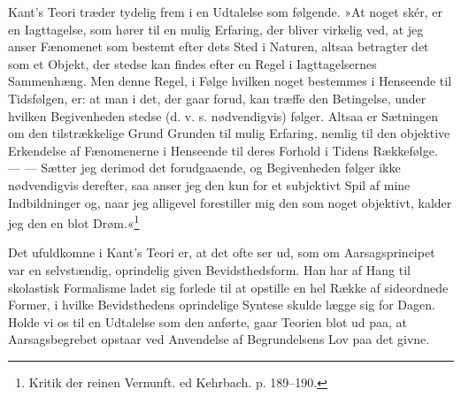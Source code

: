 \documentclass[12pt,a4paper,openany]{book}
\newcommand{\opage}[1]{\marginnote{\footnotesize\textit{[#1]}}}
\begin{document}
Kant’s Teori træder tydelig frem i en Udtalelse som følgende. »At noget
skér, er en Iagttagelse, som hører til en mulig Erfaring, der bliver
virkelig ved, at jeg anser Fænomenet som bestemt efter dets Sted i
Naturen, altsaa betragter det som et Objekt, der stedse kan findes efter
en Regel i Iagttagelsernes Sammenhæng. Men denne Regel, i Følge hvilken
noget bestemmes i Henseende til Tidsfølgen, er: at man i det,
\opage{258}der gaar forud, kan træffe den Betingelse, under hvilken
Begivenheden stedse (d. v. s. nødvendigvis) følger. Altsaa er Sætningen
om den tilstrækkelige Grund Grunden til mulig Erfaring, nemlig til den
objektive Erkendelse af Fænomenerne i Henseende til deres Forhold i
Tidens Rækkefølge. --- --- Sætter jeg derimod det forudgaaende, og
Begivenheden følger ikke nødvendigvis derefter, saa anser jeg den kun
for et subjektivt Spil af mine Indbildninger og, naar jeg alligevel
forestiller mig den som noget objektivt, kalder jeg den en blot
Drøm.«\footnote[1]{Kritik der reinen Vernunft. ed Kehrbach. p. 189--190.}

Det ufuldkomne i Kant’s Teori er, at det ofte ser ud, som om
Aarsagsprincipet var en selvstændig, oprindelig given Bevidsthedsform.
Han har af Hang til skolastisk Formalisme ladet sig forlede til at
opstille en hel Række af sideordnede Former, i hvilke Bevidsthedens
oprindelige Syntese skulde lægge sig for Dagen. Holde vi os til en
Udtalelse som den anførte, gaar Teorien blot ud paa, at Aarsagsbegrebet
opstaar ved Anvendelse af Begrundelsens Lov paa det givne.
\end{document}
